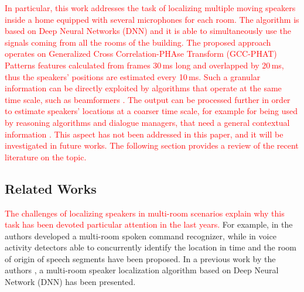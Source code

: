\documentclass[review]{elsarticle}
\begin{document}
\textcolor{red}{In particular, this work addresses the task of localizing multiple moving speakers inside a home equipped with several microphones for each room. The algorithm is based on Deep Neural Networks (DNN) and it is able to simultaneously use the signals coming from all the rooms of the building. The proposed approach operates on Generalized Cross Correlation-PHAse Transform (GCC-PHAT) Patterns \cite{xiao2015learning} features calculated from frames 30\,ms long and overlapped by 20\,ms, thus the speakers' positions are estimated every 10\,ms. Such a granular information can be directly exploited by algorithms that operate at the same time scale, such as beamformers \cite{Wolfel2009}. The output can be processed further in order to estimate speakers' locations at a coarser time scale, for example for being used by reasoning algorithms and dialogue managers, that need a general contextual information \cite{Augusto2013}. This aspect has not been addressed in this paper, and it will be investigated in future works. The following section provides a review of the recent literature on the topic.
}



\subsection{Related Works}
\textcolor{red}{The challenges of localizing speakers in multi-room scenarios explain why this task has been devoted  particular attention in the last years.}  For example, in \cite{Rodomagoulakis2017} the authors developed a multi-room spoken command recognizer, while in \cite{ijcnn-vad,vesperini2016deep,Giannoulis2015,Katsamanis2014} voice activity detectors able to concurrently identify the location in time and the room of origin of speech segments have been proposed. In a previous work by the authors \cite{vesperini2016sloc}, a multi-room speaker localization algorithm based on Deep Neural Network (DNN) has been presented.
\end{document}
